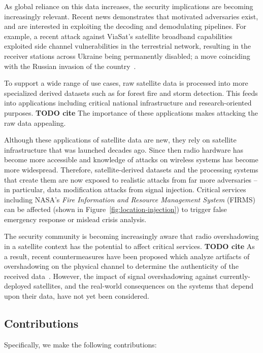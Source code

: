 As global reliance on this data increases, the security implications are becoming increasingly relevant.
Recent news demonstrates that motivated adversaries exist, and are interested in exploiting the decoding and demodulating pipelines.
For example, a recent attack against ViaSat's satellite broadband capabilities exploited side channel vulnerabilities in the terrestrial network, resulting in the receiver stations across Ukraine being permanently disabled; a move coinciding with the Russian invasion of the country~\cite{satcomAnalysis}.

To support a wide range of use cases, raw satellite data is processed into more specialized derived datasets such as for forest fire and storm detection.
This feeds into applications including critical national infrastructure and research-oriented purposes.
\textbf{TODO cite}
The importance of these applications makes attacking the raw data appealing.

Although these applications of satellite data are new, they rely on satellite infrastructure that was launched decades ago.
Since then radio hardware has become more accessible and knowledge of attacks on wireless systems has become more widespread.
Therefore, satellite-derived datasets and the processing systems that create them are now exposed to realistic attacks from far more adversaries -- in particular, data modification attacks from signal injection.
Critical services including NASA's \textit{Fire Information and Resource Management System} (FIRMS) can be affected (shown in Figure~\ref{fig:location-injection}) to trigger false emergency response or mislead crisis analysis.

The security community is becoming increasingly aware that radio overshadowing in a satellite context has the potential to affect critical services.
\textbf{TODO cite}
As a result, recent countermeasures have been proposed which analyze artifacts of overshadowing on the physical channel to determine the authenticity of the received data~\cite{jedermann2021orbit,oligeri2020past}.
However, the impact of signal overshadowing against currently-deployed satellites, and the real-world consequences on the systems that depend upon their data, have not yet been considered.

\subsection{Contributions}

Specifically, we make the following contributions:

